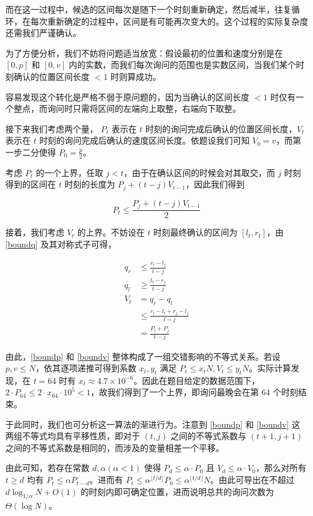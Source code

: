 \documentclass[12pt]{ctexart}
\begin{document}
而在这一过程中，候选的区间每次是随下一个时刻重新确定，然后减半，往复循环，在每次重新确定的过程中，区间是有可能再次变大的。这个过程的实际复杂度还需我们严谨确认。

为了方便分析，我们不妨将问题适当放宽：假设最初的位置和速度分别是在 $[0,p]$ 和 $[0,v]$ 内的实数，而我们每次询问的范围也是实数区间，当我们某个时刻确认的位置区间长度 $<1$ 时则算成功。

容易发现这个转化是严格不弱于原问题的，因为当确认的区间长度 $<1$ 时仅有一个整点，而询问时只需将区间的左端向上取整，右端向下取整。

接下来我们考虑两个量， $P_t$ 表示在 $t$ 时刻的询问完成后确认的位置区间长度，$V_t$ 表示在 $t$ 时刻的询问完成后确认的速度区间长度。依题设我们可知 $V_0=v$，而第一步二分使得 $P_0= \frac p2$。

考虑 $P_t$ 的一个上界，任取 $j<t$，由于在确认区间的时候会对其取交，而 $j$ 时刻得到的区间在 $t$ 时刻的长度为 $P_j+(t-j)V_{t-1}$，因此我们得到

\begin{equation}
P_t \le \frac{P_j + (t-j)V_{t-1}}2 \label{boundp}
\end{equation}

接着，我们考虑 $V_t$ 的上界。不妨设在 $t$ 时刻最终确认的区间为 $[l_t,r_t]$，由 \eqref{boundq} 及其对称式子可得，

\begin{align}
q_r &\le \frac {r_t - l_j}{t-j}\nonumber\\
q_l &\ge \frac {l_t - r_j}{t-j}\nonumber\\
V_t &= q_r-q_l\nonumber\\
 &\le \frac {r_t - l_t + r_j - l_j}{t-j}\nonumber\\
 &= \frac{P_t + P_j}{t-j} \label{boundv}
\end{align}

由此，\eqref{boundp} 和 \eqref{boundv} 整体构成了一组交错影响的不等式关系。若设 $p,v\le N$，依其逐项递推可得到系数 $x_t, y_t$ 满足 $P_t \le x_t N, V_t\le y_t N$。实际计算发现，在 $t=64$ 时有 $x_t \approx 4.7 \times 10^{-6}$。因此在题目给定的数据范围下，$2\cdot P_{64} \leq 2\cdot x_{64} \cdot 10^5 < 1$，故我们得到了一个上界，即询问最晚会在第 $64$ 个时刻结束。

于此同时，我们也可分析这一算法的渐进行为。注意到 \eqref{boundp} 和 \eqref{boundv} 这两组不等式均具有平移性质，即对于 $(t, j)$ 之间的不等式系数与 $(t+1,j+1)$ 之间的不等式系数是相同的，而涉及的变量相差一个平移。

由此可知，若存在常数 $d, \alpha (\alpha < 1)$ 使得 $P_d \le \alpha \cdot P_0$ 且 $V_d \le \alpha \cdot V_0$，那么对所有 $t\ge d$ 均有 $P_t \le \alpha P_{t-d}$。进而有 $P_t \le \alpha^{\lfloor t/d\rfloor} P_0 \le \alpha^{\lfloor t/d\rfloor} N$。由此可导出在不超过 $d\log_{1/\alpha} N + O(1)$ 的时刻内即可确定位置，进而说明总共的询问次数为 $\Theta(\log N)$。
\end{document}
